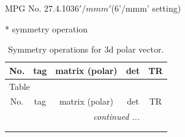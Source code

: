 \documentclass[fleqn,8pt]{jsarticle}
\begin{document}
\setcounter{MaxMatrixCols}{32}

\renewcommand{\tablename}{Table~}
\renewcommand{\figurename}{Figure~}
\begin{center}
\LARGE
MPG No. 27.4.103\quad$6'/mmm'$\quad(6'/mmm' setting)
\end{center}
* symmetry operation
\renewcommand{\arraystretch}{1.3}
\begin{longtable}{ccccc}
\caption{Symmetry operations for 3d polar vector.}
 \\
 \hline \hline
No. & tag & matrix (polar) & det & TR \\ \hline \endfirsthead

\multicolumn{4}{l}{\tablename\ \thetable{}} \\
 \hline \hline
No. & tag & matrix (polar) & det & TR \\ \hline \endhead

 \hline \hline
\multicolumn{4}{r}{\footnotesize\it continued ...} \\ \endfoot

 \hline \hline
\multicolumn{4}{r}{} \\ \endlastfoot


\end{longtable}
\end{document}
